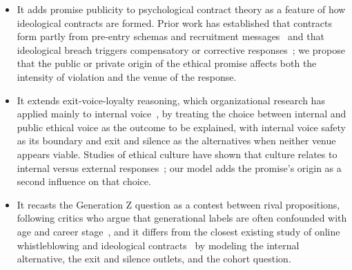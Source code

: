 \begin{itemize}
\item It adds promise publicity to psychological contract theory as a feature of how ideological contracts are formed. Prior work has established that contracts form partly from pre-entry schemas and recruitment messages~\citep{rousseau2001schema} and that ideological breach triggers compensatory or corrective responses~\citep{yang2022going,deng2023serving}; we propose that the public or private origin of the ethical promise affects both the intensity of violation and the venue of the response.

\item It extends exit-voice-loyalty reasoning, which organizational research has applied mainly to internal voice~\citep{morrison2014employee}, by treating the choice between internal and public ethical voice as the outcome to be explained, with internal voice safety as its boundary and exit and silence as the alternatives when neither venue appears viable. Studies of ethical culture have shown that culture relates to internal versus external responses~\citep{kaptein2011inaction}; our model adds the promise's origin as a second influence on that choice.

\item It recasts the Generation Z question as a contest between rival propositions, following critics who argue that generational labels are often confounded with age and career stage~\citep{rudolph2017considering,parry2011generational}, and it differs from the closest existing study of online whistleblowing and ideological contracts~\citep{yang2026managing} by modeling the internal alternative, the exit and silence outlets, and the cohort question.
\end{itemize}
